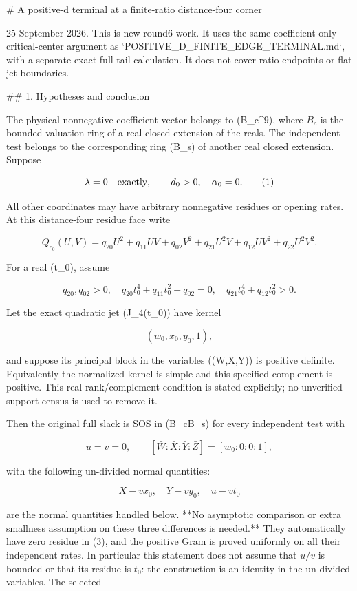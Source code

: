 # A positive-d terminal at a finite-ratio distance-four corner

25 September 2026. This is new round6 work. It uses the same coefficient-only
critical-center argument as `POSITIVE_D_FINITE_EDGE_TERMINAL.md`, with a
separate exact full-tail calculation. It does not cover ratio endpoints or
flat jet boundaries.

## 1. Hypotheses and conclusion

The physical nonnegative coefficient vector belongs to (B_c^9), where
\(B_c\) is the bounded valuation ring of a real closed extension of the
reals. The independent test belongs to the corresponding ring (B_s) of
another real closed extension. Suppose

\[
\lambda=0\quad\hbox{exactly},\qquad d_0>0,\quad\alpha_0=0.
\tag{1}
\]

All other coordinates may have arbitrary nonnegative residues or opening
rates. At this distance-four residue face write

\[
Q_{c_0}(U,V)=q_{20}U^2+q_{11}UV+q_{02}V^2
+q_{21}U^2V+q_{12}UV^2+q_{22}U^2V^2.
\]

For a real (t_0), assume

\[
q_{20},q_{02}>0,\quad
q_{20}t_0^4+q_{11}t_0^2+q_{02}=0,
\quad q_{21}t_0^4+q_{12}t_0^2>0.
\tag{2}
\]

Let the exact quadratic jet (J_4(t_0)) have kernel

\[
(w_0,x_0,y_0,1),
\]

and suppose its principal block in the variables ((W,X,Y)) is positive
definite. Equivalently the normalized kernel is simple and this specified
complement is positive. This real rank/complement condition is stated
explicitly; no unverified support census is used to remove it.

Then the original full slack is SOS in (B_c\otimes B_s) for every
independent test with

\[
\bar u=\bar v=0,\qquad
[\bar W:\bar X:\bar Y:\bar Z]=[w_0:0:0:1],
\tag{3}
\]

with the following un-divided normal quantities:

\[
X-vx_0,\quad Y-vy_0,\quad u-vt_0
\]

are the normal quantities handled below. **No asymptotic comparison or
extra smallness assumption on these three differences is needed.** They
automatically have zero residue in (3), and the positive Gram is proved
uniformly on all their independent rates. In particular this statement
does not assume that \(u/v\) is bounded or that its residue is \(t_0\): the
construction is an identity in the un-divided variables. The selected

